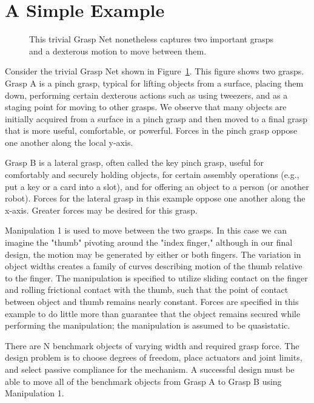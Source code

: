 \section{A Simple Example}


\begin{figure}
\begin{center}
\vspace*{2in}
\end{center}
\caption[]{This trivial Grasp Net nonetheless captures two important grasps and a dexterous motion to move between them.}
\label{SimpleGraspNet}
\end{figure}

Consider the trivial Grasp Net shown in Figure~\ref{SimpleGraspNet}.     This figure shows two grasps.   Grasp A is a pinch grasp, typical for lifting objects from a surface, placing them down, performing certain dexterous actions such as using tweezers, and as a staging point for moving to other grasps.   We observe that many objects are initially acquired from a surface in a pinch grasp and then moved to a final grasp that is more useful, comfortable, or powerful.    Forces in the pinch grasp oppose one another along the local y-axis.   

Grasp B is a lateral grasp, often called the key pinch grasp, useful for comfortably and securely holding objects, for certain assembly operations (e.g., put a key or a card into a slot), and for offering an object to a person (or another robot).   Forces for the lateral grasp in this example oppose one another along the x-axis.  Greater forces may be desired for this grasp.   

Manipulation 1 is used to move between the two grasps.   In this case we can imagine the "thumb" pivoting around the "index finger," although in our final design, the motion may be generated by either or both fingers.    The variation in object widths creates a family of curves describing motion of the thumb relative to the finger.   The manipulation is specified to utilize sliding contact on the finger and rolling frictional contact with the thumb, such that the point of contact between object and thumb remains nearly constant.  Forces are specified in this example to do little more than guarantee that the object remains secured while performing the manipulation;  the manipulation is assumed to be quasistatic.  

There are N benchmark objects of varying width and required grasp force.   The design problem is to choose degrees of freedom, place actuators and joint limits, and select passive compliance for the mechanism.  A successful design must be able to move all of the benchmark objects from Grasp A to Grasp B using Manipulation 1.

